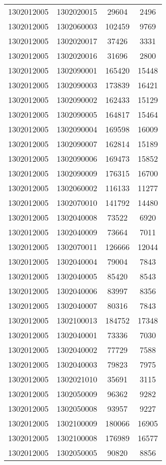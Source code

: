\begin{longtable}[h]{llcc}
		1302012005 & 1302020015 & 29604 & 2496\\
		1302012005 & 1302060003 & 102459 & 9769\\
		1302012005 & 1302020017 & 37426 & 3331\\
		1302012005 & 1302020016 & 31696 & 2800\\
		1302012005 & 1302090001 & 165420 & 15448\\
		1302012005 & 1302090003 & 173839 & 16421\\
		1302012005 & 1302090002 & 162433 & 15129\\
		1302012005 & 1302090005 & 164817 & 15464\\
		1302012005 & 1302090004 & 169598 & 16009\\
		1302012005 & 1302090007 & 162814 & 15189\\
		1302012005 & 1302090006 & 169473 & 15852\\
		1302012005 & 1302090009 & 176315 & 16700\\
		1302012005 & 1302060002 & 116133 & 11277\\
		1302012005 & 1302070010 & 141792 & 14480\\
		1302012005 & 1302040008 & 73522 & 6920\\
		1302012005 & 1302040009 & 73664 & 7011\\
		1302012005 & 1302070011 & 126666 & 12044\\
		1302012005 & 1302040004 & 79004 & 7843\\
		1302012005 & 1302040005 & 85420 & 8543\\
		1302012005 & 1302040006 & 83997 & 8356\\
		1302012005 & 1302040007 & 80316 & 7843\\
		1302012005 & 1302100013 & 184752 & 17348\\
		1302012005 & 1302040001 & 73336 & 7030\\
		1302012005 & 1302040002 & 77729 & 7588\\
		1302012005 & 1302040003 & 79823 & 7975\\
		1302012005 & 1302021010 & 35691 & 3115\\
		1302012005 & 1302050009 & 96362 & 9282\\
		1302012005 & 1302050008 & 93957 & 9227\\
		1302012005 & 1302100009 & 180066 & 16905\\
		1302012005 & 1302100008 & 176989 & 16577\\
		1302012005 & 1302050005 & 90820 & 8856\\

\end{longtable}

